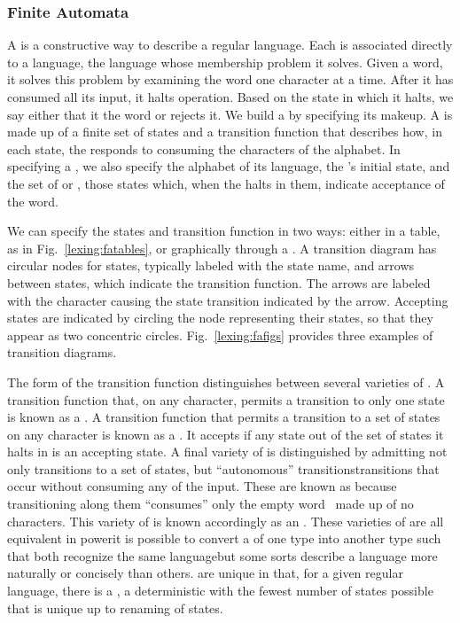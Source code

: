 \subsubsection{Finite Automata}
A \FA is a constructive way to describe a regular language. Each \FA is associated directly to a language, the language whose membership problem it solves. Given a word, it solves this problem by examining the word one character at a time. After it has consumed all its input, it halts operation. Based on the state in which it halts, we say either that it  the word or rejects it. We build a \FA by specifying its makeup. A \FA is made up of a finite set of states and a transition function that describes how, in each state, the \FA responds to consuming the characters of the alphabet. In specifying a \FA{}, we also specify the alphabet of its language, the \FA's initial state, and the set of  or , those states which, when the \FA halts in them, indicate acceptance of the word.

We can specify the states and transition function in two ways: either in a table, as in Fig.~\ref{lexing:fatables}, or graphically through a . A transition diagram has circular nodes for states, typically labeled with the state name, and arrows between states, which indicate the transition function. The arrows are labeled with the character causing the state transition indicated by the arrow. Accepting states are indicated by circling the node representing their states, so that they appear as two concentric circles. Fig.~\ref{lexing:fafigs} provides three examples of transition diagrams.





The form of the transition function distinguishes between several varieties of \FAs. A transition function that, on any character, permits a transition to only one state is known as a . A transition function that permits a transition to a set of states on any character is known as a . It accepts if any state out of the set of states it halts in is an accepting state. A final variety of \FA is distinguished by admitting not only transitions to a set of states, but ``autonomous'' transitions\empause transitions that occur without consuming any of the input. These are known as  because transitioning along them ``consumes'' only the empty word \emptyword\ made up of no characters. This variety of \FA is known accordingly as an . These varieties of \FAs are all equivalent in power\empause it is possible to convert a \FA of one type into another type such that both recognize the same language\empause but some sorts describe a language more naturally or concisely than others. \FAs[F] are unique in that, for a given regular language, there is a , a deterministic \FA with the fewest number of states possible that is unique up to renaming of states.

